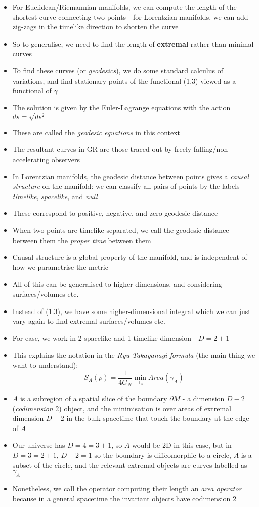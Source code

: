 \documentclass[12pt,a4paper]{article}
\numberwithin{equation}{section}
\begin{document}
\begin{itemize}
		\item For Euclidean/Riemannian manifolds, we can compute the length of the shortest curve connecting two points - for Lorentzian manifolds, we can add zig-zags in the timelike direction to shorten the curve
		\item So to generalise, we need to find the length of \textbf{extremal} rather than minimal curves
		\item To find these curves (or \textit{geodesics}), we do some standard calculus of variations, and find stationary points of the functional (1.3) viewed as a functional of $\gamma$
		\item The solution is given by the Euler-Lagrange equations with the action $ds=\sqrt{ds^{2}}$
		\item These are called the \textit{geodesic equations} in this context
		\item The resultant curves in GR are those traced out by freely-falling/non-accelerating observers
		\item In Lorentzian manifolds, the geodesic distance between points gives a \textit{causal structure} on the manifold: we can classify all pairs of points by the labels \textit{timelike}, \textit{spacelike}, and \textit{null}
		\item These correspond to positive, negative, and zero geodesic distance
		\item When two points are timelike separated, we call the geodesic distance between them the \textit{proper time} between them
		\item Causal structure is a global property of the manifold, and is independent of how we parametrise the metric
		\item All of this can be generalised to higher-dimensions, and considering surfaces/volumes etc.
		\item Instead of (1.3), we have some higher-dimensional integral which we can just vary again to find extremal surfaces/volumes etc.
		\item For ease, we work in 2 spacelike and 1 timelike dimension - $D=2+1$
		\item This explains the notation in the \textit{Ryu-Takayanagi formula} (the main thing we want to understand):
		\begin{equation}
			S_{A}(\rho)=\frac{1}{4G_{N}}\min_{\gamma_{A}}{Area(\gamma_{A})}
		\end{equation}
		\item $A$ is a subregion of a spatial slice of the boundary $\partial M$ - a dimension $D-2$ (\textit{codimension} 2) object, and the minimisation is over areas of extremal dimension $D-2$ in the bulk spacetime that touch the boundary at the edge of $A$
		\item Our universe has $D=4=3+1$, so $A$ would be 2D in this case, but in $D=3=2+1$, $D-2=1$ so the boundary is diffeomorphic to a circle, $A$ is a subset of the circle, and the relevant extremal objects are curves labelled as $\gamma_{A}$
		\item Nonetheless, we call the operator computing their length an \textit{area operator} because in a general spacetime the invariant objects have codimension 2
	\end{itemize}
\end{document}
